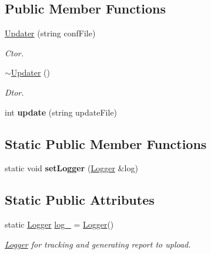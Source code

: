 \subsection*{Public Member Functions}
\begin{DoxyCompactItemize}
\item 
\hypertarget{classUpdater_aa950c2607183639f95deff560e001602}{\hyperlink{classUpdater_aa950c2607183639f95deff560e001602}{Updater} (string conf\-File)}\label{classUpdater_aa950c2607183639f95deff560e001602}

\begin{DoxyCompactList}\small\item\em Ctor. \end{DoxyCompactList}\item 
\hypertarget{classUpdater_a2f8434a97a4f3d3c716bb05abb20621e}{\hyperlink{classUpdater_a2f8434a97a4f3d3c716bb05abb20621e}{$\sim$\-Updater} ()}\label{classUpdater_a2f8434a97a4f3d3c716bb05abb20621e}

\begin{DoxyCompactList}\small\item\em Dtor. \end{DoxyCompactList}\item 
\hypertarget{classUpdater_ac3d8bfff7f81f340837d038a04265cfa}{int {\bfseries update} (string update\-File)}\label{classUpdater_ac3d8bfff7f81f340837d038a04265cfa}

\end{DoxyCompactItemize}
\subsection*{Static Public Member Functions}
\begin{DoxyCompactItemize}
\item 
\hypertarget{classUpdater_a48c4e237d38adfb1d8b725cc3aaf4432}{static void {\bfseries set\-Logger} (\hyperlink{classLogger}{Logger} \&log)}\label{classUpdater_a48c4e237d38adfb1d8b725cc3aaf4432}

\end{DoxyCompactItemize}
\subsection*{Static Public Attributes}
\begin{DoxyCompactItemize}
\item 
\hypertarget{classUpdater_a5b9b357996c983f688d47ce73197c6b6}{static \hyperlink{classLogger}{Logger} \hyperlink{classUpdater_a5b9b357996c983f688d47ce73197c6b6}{log\-\_\-} = \hyperlink{classLogger}{Logger}()}\label{classUpdater_a5b9b357996c983f688d47ce73197c6b6}

\begin{DoxyCompactList}\small\item\em \hyperlink{classLogger}{Logger} for tracking and generating report to upload. \end{DoxyCompactList}\end{DoxyCompactItemize}


